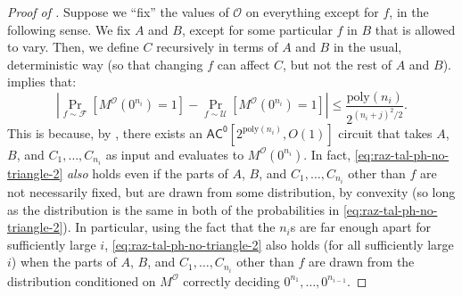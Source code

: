 \documentclass[11pt]{article}%
\newcommand{\poly}{\mathrm{poly}}
\begin{document}
\begin{proof}[Proof of ]
Suppose we ``fix'' the values of $\mathcal{O}$ on everything except for $f$, in the following sense. We fix $A$ and $B$, except for some particular $f$ in $B$ that is allowed to vary. Then, we define $C$ recursively in terms of $A$ and $B$ in the usual, deterministic way (so that changing $f$ can affect $C$, but not the rest of $A$ and $B$).  implies that:
\begin{equation}
\label{eq:raz-tal-ph-no-triangle-2}
\left|\Pr_{f \sim \mathcal{F}}\left[M^\mathcal{O}\left(0^{n_i}\right) = 1\right]-\Pr_{f \sim \mathcal{U}}\left[M^\mathcal{O}\left(0^{n_i}\right) = 1 \right]\right| \le \frac{\poly(n_i)}{2^{(n_i+j)^2/2}}.
\end{equation}
This is because, by , there exists an $\mathsf{AC^0}\left[2^{\poly(n_i)} , O(1)\right]$ circuit that takes $A$, $B$, and $C_1,\ldots,C_{n_i}$ as input and evaluates to $M^\mathcal{O}\left(0^{n_i}\right)$. In fact, \eqref{eq:raz-tal-ph-no-triangle-2} \textit{also} holds even if the parts of $A$, $B$, and $C_1,\ldots,C_{n_i}$ other than $f$ are not necessarily fixed, but are drawn from some distribution, by convexity (so long as the distribution is the same in both of the probabilities in \eqref{eq:raz-tal-ph-no-triangle-2}). In particular, using the fact that the $n_i$s are far enough apart for sufficiently large $i$, \eqref{eq:raz-tal-ph-no-triangle-2} also holds (for all sufficiently large $i$) when the parts of $A$, $B$, and $C_1,\ldots,C_{n_i}$ other than $f$ are drawn from the distribution conditioned on $M^\mathcal{O}$ correctly deciding $0^{n_1},\dots,0^{n_{i-1}}$.


\end{proof}
\end{document}
